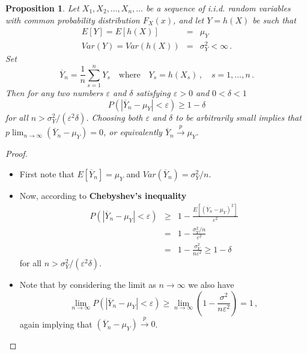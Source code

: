 \documentclass[notes=show,smaller,handout]{beamer}\usepackage[]{graphicx}\usepackage[]{color}
\newtheorem{proposition}{Proposition}[section]
\renewcommand{\Pr}{P}
\begin{document}
\begin{frame}{\secname}
  \begin{proposition}
   Let $X_{1},X_{2},\dots,X_{n},\dots$ be a sequence of \textit{i.i.d.} random variables with common probability distribution $F_X(x)$, and let $Y=h(X)$ be such that
  \begin{eqnarray*}
  E[Y]=E\left[ h(X)\right]  &=&\mu_Y  \\
  Var(Y)=Var\left( h(X)\right)  &=&\sigma_Y ^{2}<\infty\,.
  \end{eqnarray*}%
  Set
  $$
  \overline{Y}_n=\frac{1}{n}\sum_{s=1}^nY_s\quad\text{where}\quad Y_s=h(X_s)\,,\quad s=1,\ldots,n\,.
  $$
  Then for any two numbers $\varepsilon$ and $\delta$ satisfying $\varepsilon>0$ and $0<\delta<1$
  $$
  \Pr \left( \left\vert \overline{Y}_{n}-\mu_Y \right\vert<\varepsilon \right)\geq 1-\delta
  $$
  for all $n>\sigma_Y^2/(\varepsilon^2\delta)$. Choosing both $\varepsilon$ and $\delta$ to be arbitrarily small implies that $p\lim_{n\rightarrow\infty}(\overline{Y}_{n}-\mu_Y)=0$, or equivalently
  $\overline{Y}_{n}\overset{p}{\rightarrow }\mu_Y$.
  \end{proposition}
\end{frame}




\begin{frame}{\secname}
  \begin{proof}
  \begin{footnotesize}
    \begin{itemize}
    \item First note that $E[\overline{Y}_n]=\mu_Y$ and $Var(\overline{Y}_n)=\sigma_Y^2/n$.
    \item Now, according to \textbf{Chebyshev's inequality}
    \begin{eqnarray*}
    \Pr \left( |\overline{Y}_{n}-\mu_Y| <\varepsilon\right)  &\geq &1-\frac{E\left[ \left(
    \overline{Y}_{n}-\mu_Y \right) ^{2}\right] }{\varepsilon^{2}} \\
    &=&1-\frac{\sigma_Y ^{2}/n}{\varepsilon^{2}} \\
    &=&1-\frac{\sigma_Y ^{2}}{n\varepsilon^{2}}\geq 1-\delta
    \end{eqnarray*}
    for all $n>\sigma_Y^2/(\varepsilon^2\delta)$.
      \item Note that by considering the limit as $n\rightarrow \infty $ we also have%
    \begin{equation*}
    \lim_{n\rightarrow \infty }\Pr \left( \left\vert \overline{Y}_{n}-\mu_Y\right\vert <\varepsilon\right) \geq \lim_{n\rightarrow \infty }\left( 1-\frac{\sigma^{2}}{n\varepsilon^{2}}\right) =1\,,
    \end{equation*}
    again implying that $\left( \overline{Y}_{n}-\mu_Y \right) \overset{p}{\rightarrow }0$.
    \end{itemize}
  \end{footnotesize}
  \end{proof}
\end{frame}
\end{document}
